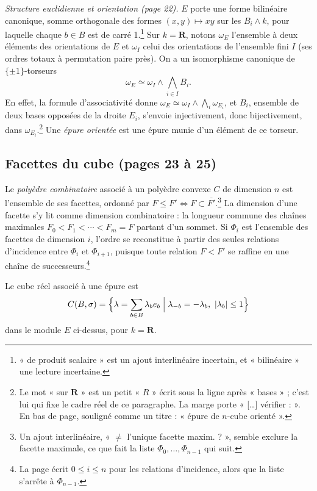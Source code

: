 \documentclass[11pt,a4paper]{article}
\begin{document}
\emph{Structure euclidienne et orientation (page 22).} $E$ porte une forme
bilinéaire canonique, somme orthogonale des formes $(x, y) \mapsto xy$ sur les
$B_{i} \wedge k$, pour laquelle chaque $b \in B$ est de carré 1.\footnote{« de
produit scalaire » est un ajout interlinéaire incertain, et « bilinéaire » une
lecture incertaine.} Sur $k = \mathbf{R}$, notons $\omega_{E}$ l'ensemble à deux
éléments des orientations de $E$ et $\omega_{I}$ celui des orientations de
l'ensemble fini $I$ (ses ordres totaux à permutation paire près). On a un
isomorphisme canonique de $\{\pm 1\}$-torseurs
\[
  \omega_{E} \simeq \omega_{I} \wedge \bigwedge_{i \in I} B_{i} .
\]
En effet, la formule d'associativité donne $\omega_{E} \simeq \omega_{I} \wedge
\bigwedge_{i} \omega_{E_{i}}$, et $B_{i}$, ensemble de deux bases opposées de la
droite $E_{i}$, s'envoie injectivement, donc bijectivement, dans
$\omega_{E_{i}}$.\footnote{Le mot « sur $\mathbf{R}$ » est un petit « $R$ » écrit
sous la ligne après « bases » ; c'est lui qui fixe le cadre réel de ce
paragraphe. La marge porte « [\ldots] vérifier : ». En bas de page, souligné comme
un titre : « épure de $n$-cube orienté ».} Une \emph{épure orientée} est une
épure munie d'un élément de ce torseur.

\subsection*{Facettes du cube (pages 23 à 25)}

Le \emph{polyèdre combinatoire} associé à un polyèdre convexe $C$ de dimension
$n$ est l'ensemble de ses facettes, ordonné par $F \leq F' \iff F \subset
\overline{F'}$.\footnote{Un ajout interlinéaire, « $\neq$ l'unique facette
maxim. ? », semble exclure la facette maximale, ce que fait la liste
$\Phi_{0}, \ldots, \Phi_{n-1}$ qui suit.} La dimension d'une facette s'y lit
comme dimension combinatoire : la longueur commune des chaînes maximales
$F_{0} < F_{1} < \cdots < F_{m} = F$ partant d'un sommet. Si $\Phi_{i}$ est
l'ensemble des facettes de dimension $i$, l'ordre se reconstitue à partir des
seules relations d'incidence entre $\Phi_{i}$ et $\Phi_{i+1}$, puisque toute
relation $F < F'$ se raffine en une chaîne de successeurs.\footnote{La page
écrit $0 \leq i \leq n$ pour les relations d'incidence, alors que la liste
s'arrête à $\Phi_{n-1}$.}

Le cube réel associé à une épure est
\[
  C(B, \sigma) = \Bigl\{ \lambda = \sum_{b \in B} \lambda_{b} e_{b} \Bigm|
  \lambda_{-b} = -\lambda_{b},\ |\lambda_{b}| \leq 1 \Bigr\}
\]
dans le module $E$ ci-dessus, pour $k = \mathbf{R}$.
\end{document}
